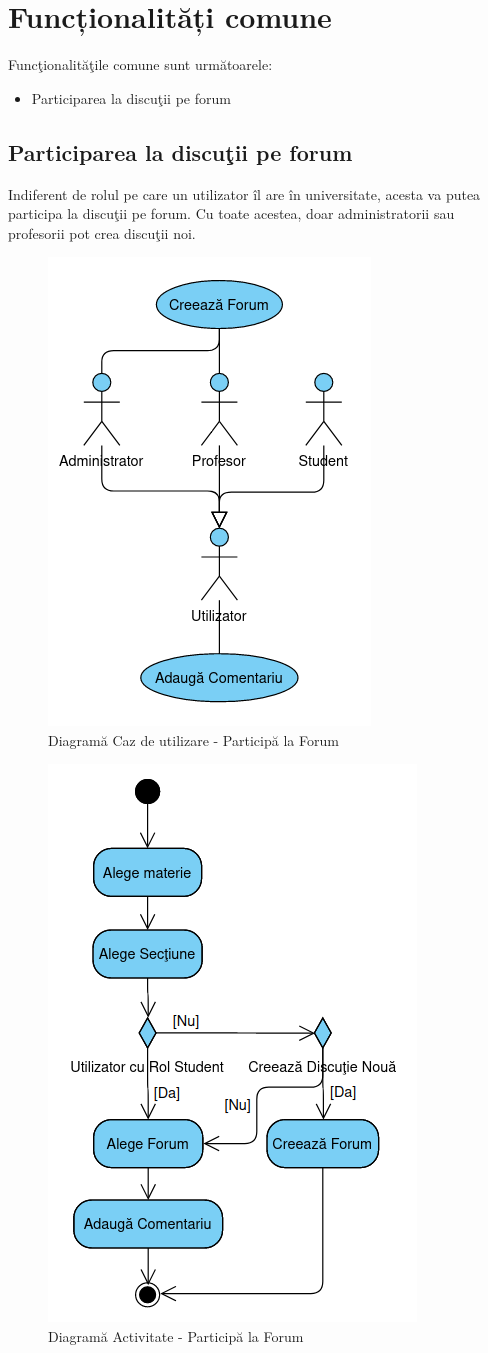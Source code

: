\documentclass[12pt, a4paper, oneside, romanian]{teza-upb}
\begin{document}
\section{Funcționalități comune}

Funcţionalităţile comune sunt următoarele:
\begin{itemize}
	\item Participarea la discuţii pe forum
\end{itemize}

\subsection{Participarea la discuţii pe forum}

Indiferent de rolul pe care un utilizator îl are în universitate, acesta va putea participa la discuţii pe forum. Cu toate acestea, doar administratorii sau profesorii pot crea discuţii noi.

\begin{figure}[H]
\centering
\includegraphics*[width=0.4\columnwidth]{diagrama-use-case-participa-la-forum}
\caption{Diagramă Caz de utilizare - Participă la Forum}
\label{diagrama-use-case-participa-la-forum}
\end{figure}

\begin{figure}[H]
\centering
\includegraphics*[width=0.5\columnwidth]{diagrama-activitate-participa-la-forum}
\caption{Diagramă Activitate - Participă la Forum}
\label{diagrama-activitate-participa-la-forum}
\end{figure}
\end{document}
